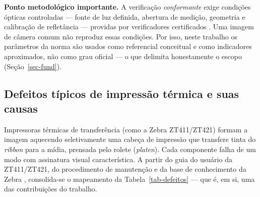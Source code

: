 \documentclass[
	article,			%
	11pt,				%
	oneside,			%
	a4paper,			%
	english,			%
	brazilian,			%
	sumario=tradicional
	]{abntex2}
\begin{document}
\noindent\textbf{Ponto metodológico importante.} A verificação \textit{conformante}
exige condições ópticas controladas --- fonte de luz definida, abertura de
medição, geometria e calibração de refletância --- providas por verificadores
certificados \cite{iso15426}. Uma imagem de câmera comum não reproduz essas
condições. Por isso, neste trabalho os parâmetros da norma são usados como
referencial conceitual e como indicadores aproximados, não como grau oficial ---
o que delimita honestamente o escopo (Seção~\ref{sec-fund}).

\subsection{Defeitos típicos de impressão térmica e suas causas}\label{sec-defeitos}

Impressoras térmicas de transferência (como a Zebra ZT411/ZT421) formam a imagem
aquecendo seletivamente uma cabeça de impressão que transfere tinta do
\textit{ribbon} para a mídia, prensada pelo rolete (\textit{platen}). Cada
componente falha de um modo com assinatura visual característica. A partir do guia
do usuário da ZT411/ZT421, do procedimento de manutenção e da base de
conhecimento da Zebra \cite{zebra_printquality}, consolida-se o mapeamento da
Tabela~\ref{tab-defeitos} --- que é, em si, uma das contribuições do trabalho.
\end{document}
